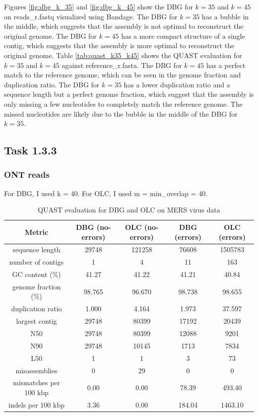 \documentclass[12pt]{article}
\begin{document}
Figures \ref{fig:dbg_k_35} and \ref{fig:dbg_k_45} show the DBG for $k=35$ and $k=45$ on reads\_r.fastq visualized using Bandage. The DBG for $k=35$ has a bubble in the middle, which suggests that the assembly is not optimal to reconstruct the original genome. The DBG for $k=45$ has a more compact structure of a single contig, which suggests that the assembly is more optimal to reconstruct the original genome.
Table \ref{tab:quast_k35_k45} shows the QUAST evaluation for $k=35$ and $k=45$ against reference\_r.fasta. The DBG for $k=45$ has a perfect match to the reference genome, which can be seen in the genome fraction and duplication ratio. The DBG for $k=35$ has a lower duplication ratio and a sequence length but a perfect genome fraction, which suggest that the assembly is only missing a few nucleotides to completely match the reference genome.
The missed nucleotides are likely due to the bubble in the middle of the DBG for $k=35$.


\subsection{Task 1.3.3}

\subsubsection{ONT reads}
For DBG, I used k = 40. For OLC, I used m = min\_overlap = 40.

\begin{table}[h!]
\begin{center}
\begin{tabular}{ |c|c|c||c|c| }
    \hline
    Metric               & DBG (no-errors) & OLC (no-errors) & DBG (errors) & OLC (errors) \\
    \hline
    sequence length      & 29748  & 121258  & 76608 & 1505783 \\
    number of contigs    & 1      & 4       & 11 & 163 \\
    GC content (\%)      & 41.27  & 41.22    & 41.21 & 40.84 \\
    genome fraction (\%) & 98.765 & 96.670    & 98.738 & 98.655 \\
    duplication ratio    & 1.000  & 4.164    & 1.973 & 37.597 \\
    largest contig       & 29748  & 80399    & 17192 & 20439 \\
    N50                  & 29748  & 80399    & 12088 & 9201 \\
    N90                  & 29748  & 10145    & 1713 & 7834 \\
    L50                  & 1      & 1       & 3 & 73 \\
    misassemblies        & 0      & 29        & 0 & 0 \\
    mismatches per 100 kbp & 0.00 & 0.00     & 78.39 & 493.40 \\
    indels per 100 kbp   & 3.36   & 0.00     & 184.04 & 1463.10  \\
    \hline
\end{tabular}
\end{center}
\caption{QUAST evaluation for DBG and OLC on MERS virus data}
\label{tab:quast_mers}
\end{table}
\end{document}
